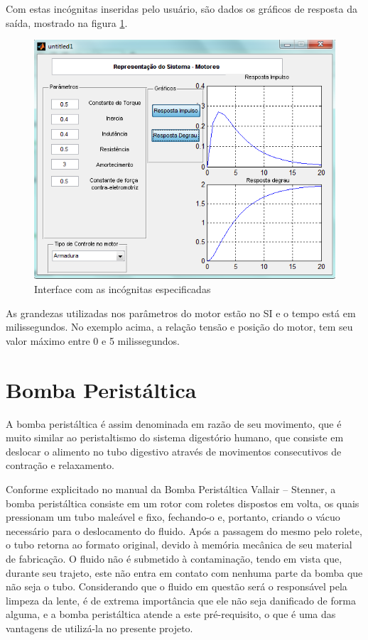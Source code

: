 Com estas incógnitas inseridas pelo usuário, são dados os gráficos de resposta da saída, mostrado na figura \ref{simulacao2}.

\begin{figure}[H]
		\centering
			\includegraphics[scale=1.0]{figuras/simulacao2.png}
		\caption{Interface com as incógnitas especificadas}
		\label{simulacao2}
\end{figure}

As grandezas utilizadas nos parâmetros do motor estão no SI e o tempo está em milissegundos. No exemplo acima, a relação tensão e posição do motor, tem seu valor máximo entre 0 e 5 milissegundos.

\section[Bomba Peristáltica]{Bomba Peristáltica}

A bomba peristáltica é assim denominada em razão de seu movimento, que é muito similar ao peristaltismo do sistema digestório humano, que consiste em deslocar o alimento no tubo digestivo através de movimentos consecutivos de contração e relaxamento.

Conforme explicitado no manual da Bomba Peristáltica Vallair – Stenner, a bomba peristáltica consiste em um rotor com roletes dispostos em volta, os quais pressionam um tubo maleável e fixo, fechando-o e, portanto, criando o vácuo necessário para o deslocamento do fluido. Após a passagem do mesmo pelo rolete, o tubo retorna ao formato original, devido à memória mecânica de seu material de fabricação. O fluido não é submetido à contaminação, tendo em vista que, durante seu trajeto, este não entra em contato com nenhuma parte da bomba que não seja o tubo. Considerando que o fluido em questão será o responsável pela limpeza da lente, é de extrema importância que ele não seja danificado de forma alguma, e a bomba peristáltica atende a este pré-requisito, o que é uma das vantagens de utilizá-la no presente projeto.

